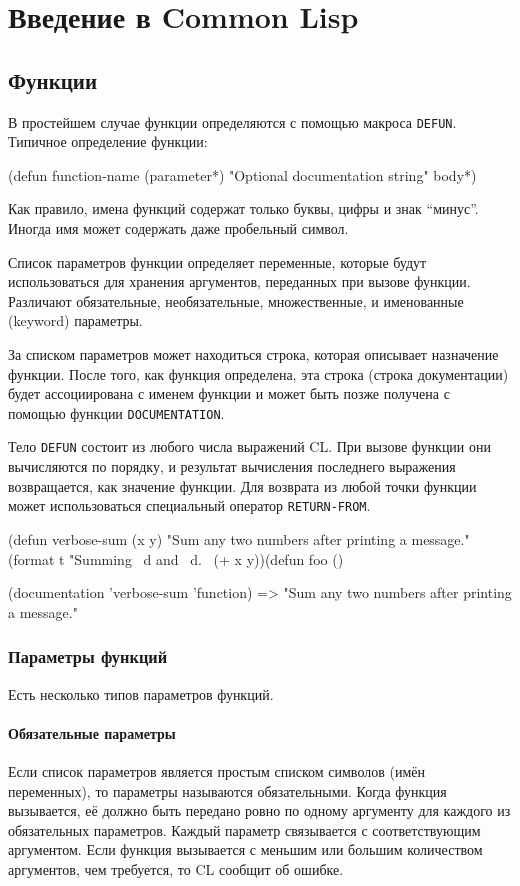 \chapter{Введение в Common Lisp}
\label{ch:cl}

\section{Функции}
В простейшем случае функции определяются с помощью макроса \lstinline{DEFUN}. Типичное определение функции:

\begin{cllst}{}{}
(defun function-name (parameter*)
  "Optional documentation string"
  body*)
\end{cllst}

Как правило, имена функций содержат только буквы, цифры и знак ``минус''. Иногда имя может содержать даже пробельный символ.

Список параметров функции определяет переменные, которые будут использоваться для хранения аргументов, переданных при вызове функции. Различают обязательные, необязательные, множественные, и именованные (keyword) параметры.

За списком параметров может находиться строка, которая описывает назначение функции. После того, как функция определена, эта строка (строка документации) будет ассоциирована с именем функции и может быть позже получена с помощью функции \lstinline{DOCUMENTATION}.

Тело \lstinline{DEFUN} состоит из любого числа выражений CL. При вызове функции они вычисляются по порядку, и результат вычисления последнего выражения возвращается, как значение функции. Для возврата из любой точки функции может использоваться специальный оператор \lstinline{RETURN-FROM}.
\begin{cllst}{}{}
(defun verbose-sum (x y)
  "Sum any two numbers after printing a message."
  (format t "Summing ~d and ~d.~%
  (+ x y))(defun foo ()

(documentation 'verbose-sum 'function) => "Sum any two numbers after printing a message."
\end{cllst}

\subsection{Параметры функций}
Есть несколько типов параметров функций.

\subsubsection{Обязательные параметры}
Если список параметров является простым списком символов (имён переменных), то параметры называются обязательными. Когда функция вызывается, её должно быть передано ровно по одному аргументу для каждого из обязательных параметров. Каждый параметр связывается с соответствующим аргументом. Если функция вызывается с меньшим или большим количеством аргументов, чем требуется, то CL сообщит об ошибке.

